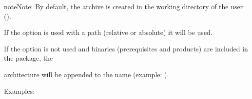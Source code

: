 \documentclass[a4paper,10pt,english]{sphinxmanual}
\begin{document}
\begin{sphinxadmonition}{note}{Note:}
By default, the archive is created in the working directory of the user ().

If the option  is used with a path (relative or absolute) it will be used.

If the option  is not used and binaries (prerequisites and products)
are included in the package, the %
\begin{footnote}[16]\sphinxAtStartFootnote
{}
%
\end{footnote} architecture
will be appended to the name (example: ).

Examples:

%
\begin{sphinxVerbatim}[commandchars=\\\{\}]
  

   

    
\end{sphinxVerbatim}
\end{sphinxadmonition}
\end{document}

